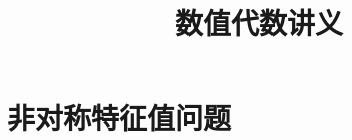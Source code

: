 \documentclass{book}
\begin{document}
\title{数值代数讲义}
\maketitle

\chapter{非对称特征值问题}


\cite{stein2003}


\end{document}
